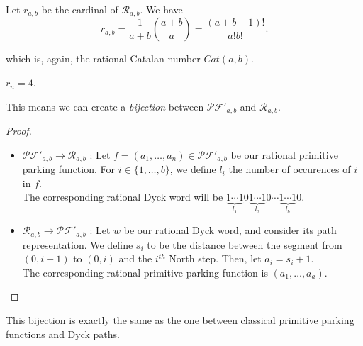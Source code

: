\begin{theorem}[Bizley, 1954]
    Let $r_{a,b}$ be the cardinal of $\mathcal{R}_{a,b}$.
    We have $$r_{a,b} = \frac{1}{a+b} \binom {a+b}{a} =
    \frac{(a+b-1)!}{a!b!}.$$
\end{theorem}

which is, again, the rational Catalan number $Cat(a,b)$.

\begin{example}[$a = 7, b = 2$]
    $r_n = 4$.
    \begin{center}
        
        
        
        
    \end{center}
\end{example}

\begin{prop}
    This means we can create a \emph{bijection} between
    $\mathcal{PF'}_{a,b}$ and $\mathcal{R}_{a,b}$.
\end{prop}

\begin{proof}
    ~\
\begin{itemize}
    \item $\mathcal{PF'}_{a,b} \to \mathcal{R}_{a,b}$ :
    Let $f = (a_1, \ldots, a_n) \in \mathcal{PF'}_{a,b}$
    be our rational primitive parking function.
    For $i \in \{1, \ldots, b\}$, we define $l_i$ the
    number of occurences of $i$ in $f$.\\
    The corresponding rational Dyck word will be
    $\underbrace{1 \cdots 1}_{l_1}0
     \underbrace{1 \cdots 1}_{l_2}0 \cdots
     \underbrace{1 \cdots 1}_{l_b}0$.
    
    \item $\mathcal{R}_{a,b} \to \mathcal{PF'}_{a,b}$ :
    Let $w$ be our rational Dyck word, and consider its path
    representation. We define $s_i$ to be the distance
    between the segment from $(0, i - 1)$ to $(0, i)$
    and the $i^{th}$ North step. Then, let $a_i = s_i + 1$.\\
    The corresponding rational primitive parking function is 
    $(a_1, \ldots, a_a)$.
\end{itemize}
\end{proof}

\begin{rem}
    This bijection is exactly the same as the one between
    classical primitive parking functions and Dyck paths.
\end{rem}


